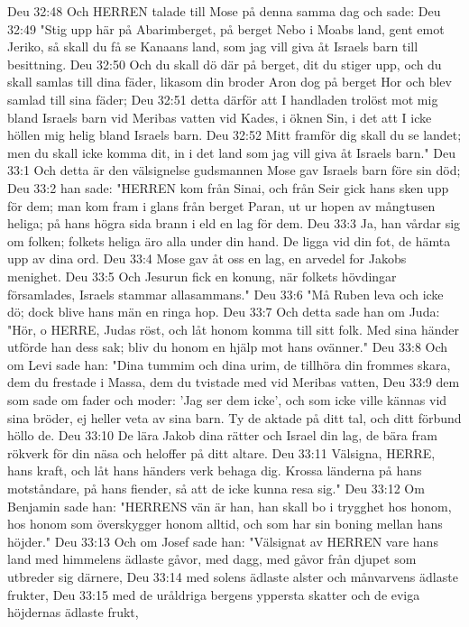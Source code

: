 Deu 32:48  Och HERREN talade till Mose på denna samma dag och sade:
Deu 32:49  "Stig upp här på Abarimberget, på berget Nebo i Moabs land, gent emot Jeriko, så skall du få se Kanaans land, som jag vill giva åt Israels barn till besittning.
Deu 32:50  Och du skall dö där på berget, dit du stiger upp, och du skall samlas till dina fäder, likasom din broder Aron dog på berget Hor och blev samlad till sina fäder;
Deu 32:51  detta därför att I handladen trolöst mot mig bland Israels barn vid Meribas vatten vid Kades, i öknen Sin, i det att I icke höllen mig helig bland Israels barn.
Deu 32:52  Mitt framför dig skall du se landet; men du skall icke komma dit, in i det land som jag vill giva åt Israels barn."
Deu 33:1  Och detta är den välsignelse gudsmannen Mose gav Israels barn före sin död;
Deu 33:2  han sade: "HERREN kom från Sinai, och från Seir gick hans sken upp för dem; man kom fram i glans från berget Paran, ut ur hopen av mångtusen heliga; på hans högra sida brann i eld en lag för dem.
Deu 33:3  Ja, han vårdar sig om folken; folkets heliga äro alla under din hand. De ligga vid din fot, de hämta upp av dina ord.
Deu 33:4  Mose gav åt oss en lag, en arvedel for Jakobs menighet.
Deu 33:5  Och Jesurun fick en konung, när folkets hövdingar församlades, Israels stammar allasammans."
Deu 33:6  "Må Ruben leva och icke dö; dock blive hans män en ringa hop.
Deu 33:7  Och detta sade han om Juda: "Hör, o HERRE, Judas röst, och låt honom komma till sitt folk. Med sina händer utförde han dess sak; bliv du honom en hjälp mot hans ovänner."
Deu 33:8  Och om Levi sade han: "Dina tummim och dina urim, de tillhöra din frommes skara, dem du frestade i Massa, dem du tvistade med vid Meribas vatten,
Deu 33:9  dem som sade om fader och moder: 'Jag ser dem icke', och som icke ville kännas vid sina bröder, ej heller veta av sina barn. Ty de aktade på ditt tal, och ditt förbund höllo de.
Deu 33:10  De lära Jakob dina rätter och Israel din lag, de bära fram rökverk för din näsa och heloffer på ditt altare.
Deu 33:11  Välsigna, HERRE, hans kraft, och låt hans händers verk behaga dig. Krossa länderna på hans motståndare, på hans fiender, så att de icke kunna resa sig."
Deu 33:12  Om Benjamin sade han: "HERRENS vän är han, han skall bo i trygghet hos honom, hos honom som överskygger honom alltid, och som har sin boning mellan hans höjder."
Deu 33:13  Och om Josef sade han: "Välsignat av HERREN vare hans land med himmelens ädlaste gåvor, med dagg, med gåvor från djupet som utbreder sig därnere,
Deu 33:14  med solens ädlaste alster och månvarvens ädlaste frukter,
Deu 33:15  med de uråldriga bergens yppersta skatter och de eviga höjdernas ädlaste frukt,
